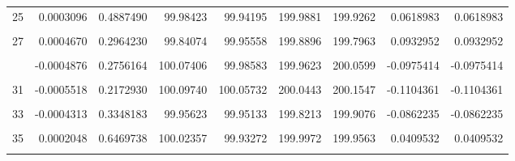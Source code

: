 \documentclass[a4paper]{tufte-handout}
\begin{document}
\begin{table}
{\begin{tabular}[t]{rrrrrrrrr}
25 & 0.0003096 & 0.4887490 & 99.98423 & 99.94195 & 199.9881 & 199.9262 & 0.0618983 & 0.0618983\\
\cellcolor{gray!6}{26} & \cellcolor{gray!6}{-0.0003628} & \cellcolor{gray!6}{0.4171664} & \cellcolor{gray!6}{99.91858} & \cellcolor{gray!6}{99.99546} & \cellcolor{gray!6}{199.8415} & \cellcolor{gray!6}{199.9140} & \cellcolor{gray!6}{-0.0725379} & \cellcolor{gray!6}{-0.0725379}\\
27 & 0.0004670 & 0.2964230 & 99.84074 & 99.95558 & 199.8896 & 199.7963 & 0.0932952 & 0.0932952\\
\cellcolor{gray!6}{28} & \cellcolor{gray!6}{0.0001997} & \cellcolor{gray!6}{0.6551878} & \cellcolor{gray!6}{100.06020} & \cellcolor{gray!6}{99.96489} & \cellcolor{gray!6}{200.0650} & \cellcolor{gray!6}{200.0251} & \cellcolor{gray!6}{0.0399472} & \cellcolor{gray!6}{0.0399472}\\
\addlinespace
29 & -0.0004876 & 0.2756164 & 100.07406 & 99.98583 & 199.9623 & 200.0599 & -0.0975414 & -0.0975414\\
\cellcolor{gray!6}{30} & \cellcolor{gray!6}{0.0001878} & \cellcolor{gray!6}{0.6745860} & \cellcolor{gray!6}{100.10249} & \cellcolor{gray!6}{99.97609} & \cellcolor{gray!6}{200.1162} & \cellcolor{gray!6}{200.0786} & \cellcolor{gray!6}{0.0375684} & \cellcolor{gray!6}{0.0375684}\\
31 & -0.0005518 & 0.2172930 & 100.09740 & 100.05732 & 200.0443 & 200.1547 & -0.1104361 & -0.1104361\\
\cellcolor{gray!6}{32} & \cellcolor{gray!6}{0.0001833} & \cellcolor{gray!6}{0.6818780} & \cellcolor{gray!6}{100.14285} & \cellcolor{gray!6}{100.04816} & \cellcolor{gray!6}{200.2277} & \cellcolor{gray!6}{200.1910} & \cellcolor{gray!6}{0.0366978} & \cellcolor{gray!6}{0.0366978}\\
33 & -0.0004313 & 0.3348183 & 99.95623 & 99.95133 & 199.8213 & 199.9076 & -0.0862235 & -0.0862235\\
\addlinespace
\cellcolor{gray!6}{34} & \cellcolor{gray!6}{-0.0008274} & \cellcolor{gray!6}{0.0642915} & \cellcolor{gray!6}{99.97238} & \cellcolor{gray!6}{100.05238} & \cellcolor{gray!6}{199.8593} & \cellcolor{gray!6}{200.0248} & \cellcolor{gray!6}{-0.1655032} & \cellcolor{gray!6}{-0.1655032}\\
35 & 0.0002048 & 0.6469738 & 100.02357 & 99.93272 & 199.9972 & 199.9563 & 0.0409532 & 0.0409532\\
\cellcolor{gray!6}{36} & \cellcolor{gray!6}{0.0004283} & \cellcolor{gray!6}{0.3382556} & \cellcolor{gray!6}{100.08332} & \cellcolor{gray!6}{100.04006} & \cellcolor{gray!6}{200.2091} & \cellcolor{gray!6}{200.1234} & \cellcolor{gray!6}{0.0857048} & \cellcolor{gray!6}{0.0857048}\\

\end{tabular}}
\end{table}
\end{document}
